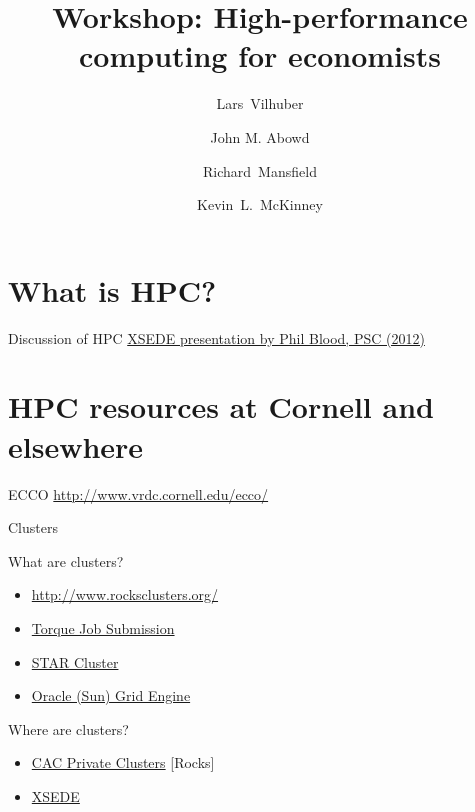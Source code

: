 \documentclass[xcolor=table,compress]{beamer}
\title[Computing for Economists]{Workshop: High-performance computing for economists}
\author[Vilhuber, Abowd, Mansfield, McKinney]{%
  Lars~Vilhuber\inst{1} \and
  John M. Abowd\inst{1} \and
  Richard~Mansfield\inst{1} \and
  Kevin~L.~McKinney %
}
\institute[Cornell]{
  \inst{1}%
   Cornell University, Economics Department,
}%
\begin{document}
\frame{\titlepage}
\section{What is HPC?}

\begin{frame}{Discussion of HPC}
\href{http://www.vrdc.cornell.edu/computing-for-economists/documents/XSEDE_ICE_2012.pdf}{XSEDE
 presentation by Phil Blood, PSC (2012)}
\end{frame}

\section[HPC resources]{HPC resources at Cornell and elsewhere}

\begin{frame}{ECCO}
\href{http://www2.vrdc.cornell.edu/ecco/}{http://www.vrdc.cornell.edu/ecco/}
\end{frame}

\begin{frame}{Clusters}
\begin{block}{What are clusters?}
\begin{itemize}
\item \href{http://www.rocksclusters.org/wordpress/}{http://www.rocksclusters.org/}
\item \href{http://www.clusterresources.com/torquedocs21/2.1jobsubmission.shtml}{Torque Job Submission}
\item \href{http://star.mit.edu/cluster/docs/latest/index.html}{STAR Cluster}
\item \href{http://www.oracle.com/us/products/tools/oracle-grid-engine-075549.html}{Oracle (Sun) Grid Engine}
\end{itemize}
\end{block}

\end{frame}

\begin{frame}{Where are clusters?}
\begin{itemize}
\item \href{http://www.cac.cornell.edu/services/hpcsystems.aspx}{CAC Private Clusters} [Rocks]
\item \href{https://www.xsede.org/}{XSEDE}
\end{itemize}
\end{frame}
\end{document}
